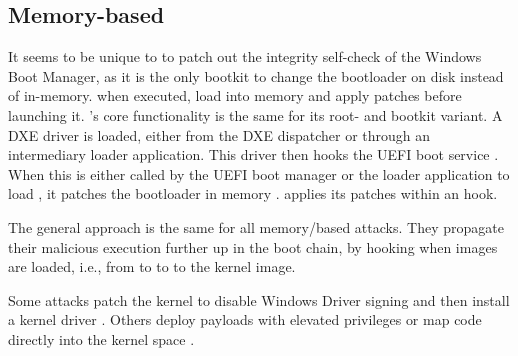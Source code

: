 \subsection{Memory-based}

It seems to be unique to \cite{especter} to patch out the integrity self-check of the Windows Boot Manager, as it is the only bootkit to change the bootloader on disk instead of in-memory.
\cite{finspy, dreamboot} when executed, load  into memory and apply patches before launching it.
\cite{efiguard}'s core functionality is the same for its root- and bootkit variant.
A \ac{DXE} driver is loaded, either from the \ac{DXE} dispatcher or through an intermediary loader application.
This driver then hooks the \ac{UEFI} boot service . When this is either called by the \ac{UEFI} boot manager or the loader application to load , it patches the bootloader in memory \cite{efiguard}. \cite{moonbounce} applies its patches within an  hook.

The general approach is the same for all memory\-/based attacks.
They propagate their malicious execution further up in the boot chain, by hooking when images are loaded, i.e., from  to  to  to the kernel image.

Some attacks patch the kernel to disable Windows Driver signing and then install a kernel driver \cite{efiguard,especter}.
Others deploy payloads with elevated privileges \cite{finspy, dreamboot} or map code directly into the kernel space \cite{moonbounce,cosmicstrand}.